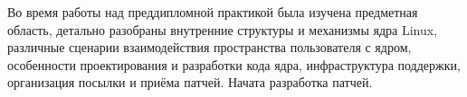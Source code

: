 \label{sec:outro}

Во время работы над преддипломной практикой была изучена предметная область,
детально разобраны внутренние структуры и механизмы ядра Linux, различные
сценарии взаимодействия пространства пользователя с ядром, особенности
проектирования и разработки кода ядра, инфраструктура поддержки, организация
посылки и приёма патчей. Начата разработка патчей.